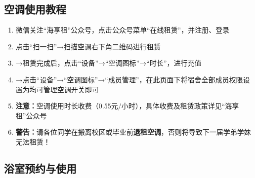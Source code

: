 \subsection[空调使用教程]{空调使用教程}
\label{air_control}
\begin{enumerate}
    \item 微信关注“海享租”公众号，点击公众号菜单“在线租赁”，并注册、登录
    \item 点击“扫一扫”→扫描空调右下角二维码进行租赁\footnotemark
    \item →租赁完成后，点击“设备”→“空调图标”→“时长”，进行充值
    \item →点击“设备”→“空调图标”→“成员管理”，在此页面下将宿舍全部成员权限设置为均可管理空调开关即可
    \item \textbf{注意：}空调使用时长收费（0.55元/小时），具体收费及租赁政策详见“海享租”公众号
    \item \textbf{警告：}请各位同学在搬离校区或毕业前\textbf{退租空调}，否则将导致下一届学弟学妹无法租赁！
\end{enumerate}

\subsection[浴室预约与使用]{浴室预约与使用}
